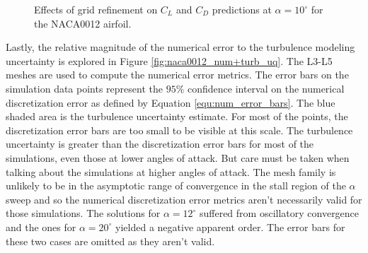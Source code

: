 \begin{figure}
\center
{}
\caption{Effects of grid refinement on $C_L$ and $C_D$ predictions at $\alpha = 10^\circ$ for the NACA0012 airfoil.}\label{fig:naca0012_mesh_sweeps}
\end{figure}

Lastly, the relative magnitude of the numerical error to the turbulence modeling uncertainty is explored in Figure \ref{fig:naca0012_num+turb_uq}. 
The L3-L5 meshes are used to compute the numerical error metrics. 
The error bars on the simulation data points represent the $95\%$ confidence interval on the numerical discretization error as defined by Equation \ref{equ:num_error_bars}.
The blue shaded area is the turbulence uncertainty estimate. 
For most of the points, the discretization error bars are too small to be visible at this scale.
The turbulence uncertainty is greater than the discretization error bars for most of the simulations, even those at lower angles of attack. 
But care must be taken when talking about the simulations at higher angles of attack. 
The mesh family is unlikely to be in the asymptotic range of convergence in the stall region of the $\alpha$ sweep and so the numerical discretization error metrics aren't necessarily valid for those simulations. 
The solutions for $\alpha = 12^\circ$ suffered from oscillatory convergence and the ones for $\alpha = 20^\circ$ yielded a negative apparent order.
The error bars for these two cases are omitted as they aren't valid.


